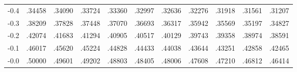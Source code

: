 \documentclass[]{article}
\begin{document}
\begin{center}
\begin{tabular}{l|llllllllll}
        -0.4 & .34458 & .34090 & .33724 & .33360 & .32997 & .32636 & .32276 & .31918 & .31561 & .31207 \\
        -0.3 & .38209 & .37828 & .37448 & .37070 & .36693 & .36317 & .35942 & .35569 & .35197 & .34827 \\
        -0.2 & .42074 & .41683 & .41294 & .40905 & .40517 & .40129 & .39743 & .39358 & .38974 & .38591 \\
        -0.1 & .46017 & .45620 & .45224 & .44828 & .44433 & .44038 & .43644 & .43251 & .42858 & .42465 \\
        -0.0 & .50000 & .49601 & .49202 & .48803 & .48405 & .48006 & .47608 & .47210 & .46812 & .46414
    \end{tabular}
\end{center}
\end{document}
